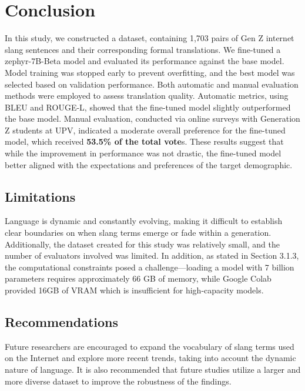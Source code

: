 \chapter{Conclusion}
In this study, we constructed a dataset, containing 1,703 pairs of Gen Z internet slang sentences and their corresponding formal translations. We fine-tuned a zephyr-7B-Beta model and  evaluated its performance against the base model. Model training was stopped early to prevent overfitting, and the best model was selected based on validation performance. Both automatic and manual evaluation methods were employed to assess translation quality. Automatic metrics, using BLEU and ROUGE-L, showed that the fine-tuned model slightly outperformed the base model. Manual evaluation, conducted via online surveys with Generation Z students at UPV, indicated a moderate overall preference for the fine-tuned model, which received \textbf{53.5\% of the total vote}s. These results suggest that while the improvement in performance was not drastic, the fine-tuned model better aligned with the expectations and preferences of the target demographic.

\section{Limitations}
Language is dynamic and constantly evolving, making it difficult to establish clear boundaries on when slang terms emerge or fade within a generation. Additionally, the dataset created for this study was relatively small, and the number of evaluators involved was limited. In addition, as stated in Section 3.1.3, the computational constraints posed a challenge—loading a model with 7 billion parameters requires approximately 66 GB of memory, while Google Colab provided 16GB of VRAM which is insufficient for high-capacity models.

\section{Recommendations}
Future researchers are encouraged to expand the vocabulary of slang terms used on the Internet and explore more recent trends, taking into account the dynamic nature of language. It is also recommended that future studies utilize a larger and more diverse dataset to improve the robustness of the findings.